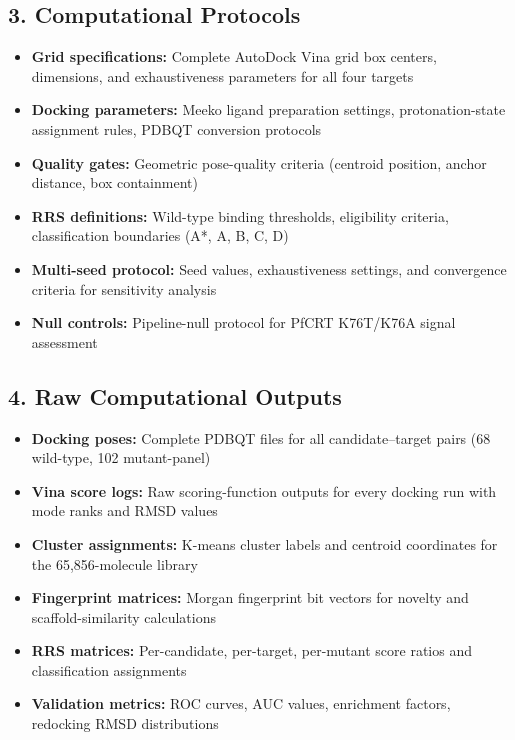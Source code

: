 \documentclass[11pt,a4paper]{article}
\begin{document}
\subsection*{3. Computational Protocols}

\begin{itemize}[leftmargin=*]
\item \textbf{Grid specifications:} Complete AutoDock Vina grid box centers, dimensions, and exhaustiveness parameters for all four targets
\item \textbf{Docking parameters:} Meeko ligand preparation settings, protonation-state assignment rules, PDBQT conversion protocols
\item \textbf{Quality gates:} Geometric pose-quality criteria (centroid position, anchor distance, box containment)
\item \textbf{RRS definitions:} Wild-type binding thresholds, eligibility criteria, classification boundaries (A*, A, B, C, D)
\item \textbf{Multi-seed protocol:} Seed values, exhaustiveness settings, and convergence criteria for sensitivity analysis
\item \textbf{Null controls:} Pipeline-null protocol for PfCRT K76T/K76A signal assessment
\end{itemize}

\subsection*{4. Raw Computational Outputs}

\begin{itemize}[leftmargin=*]
\item \textbf{Docking poses:} Complete PDBQT files for all candidate--target pairs (68 wild-type, 102 mutant-panel)
\item \textbf{Vina score logs:} Raw scoring-function outputs for every docking run with mode ranks and RMSD values
\item \textbf{Cluster assignments:} K-means cluster labels and centroid coordinates for the 65,856-molecule library
\item \textbf{Fingerprint matrices:} Morgan fingerprint bit vectors for novelty and scaffold-similarity calculations
\item \textbf{RRS matrices:} Per-candidate, per-target, per-mutant score ratios and classification assignments
\item \textbf{Validation metrics:} ROC curves, AUC values, enrichment factors, redocking RMSD distributions
\end{itemize}
\end{document}
